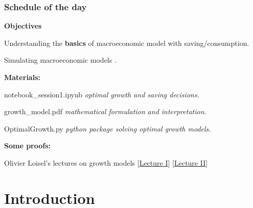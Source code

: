 \documentclass[xcolor=x11names,compress,aspectratio=169]{beamer}%
\makeatletter
\renewenvironment{itemize}{\begin{compactitemize}[<+-| alert@+>]}{\end{compactitemize}}
\makeatother
\begin{document}
\begin{frame}%
%

\frametitle{Schedule of the day}%


\textbf{Objectives}

\begin{itemize}
\item Understanding the \textbf{basics} of macroeconomic model with saving/consumption.

\item Simulating macroeconomic models .%
\vspace{1ex}%

\end{itemize}

\textbf{Materials:}

\begin{itemize}
\item \textsf{notebook\_session1.ipynb} \textit{optimal growth and saving decisions.}

\item \textsf{growth\_model.pdf} \textit{mathematical formulation and interpretation.}

\item \textsf{OptimalGrowth.py} \textit{python package solving optimal
growth models.}
\end{itemize}

\textbf{Some proofs:}

\begin{itemize}
\item Olivier Loisel's lectures on growth models
[\href{https://olivierloisel.com/macroeconomics/Chapter\%201.pdf}{Lecture I}]
[\href{https://olivierloisel.com/macroeconomics/Chapter\%202.pdf}{Lecture II}]
\end{itemize}

%

\transboxout
\end{frame}%


\section{Introduction}
\end{document}
